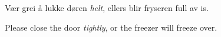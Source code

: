 \documentclass[a4paper,landscape]{slides}
\begin{document}
\fontsize{42}{52}
\selectfont
{ V\ae{}r grei \aa{} lukke d\o{}ren \emph{helt}, ellers blir fryseren full av is.}

{ Please close the door \emph{tightly}, or the freezer will freeze over.}
\end{document}
